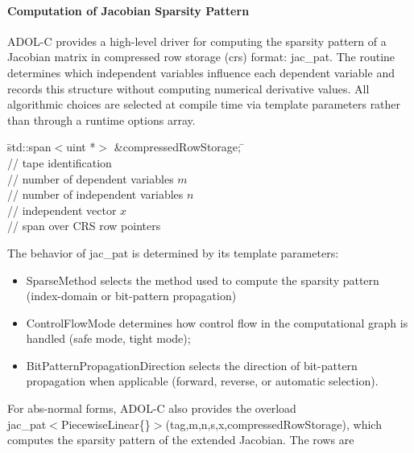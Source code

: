 \documentclass[11pt,twoside]{article}
\begin{document}
\paragraph{Computation of Jacobian Sparsity Pattern}
%
ADOL-C provides a high-level driver for computing the sparsity pattern
of a Jacobian matrix in compressed row storage (crs) format:
{\sf jac\_pat}.  The routine determines which independent variables
influence each dependent variable and records this structure without
computing numerical derivative values.
%
All algorithmic choices are selected at compile time via template
parameters rather than through a runtime {\sf options} array.
%
\begin{tabbing}
\hspace{0.5in}\={\sf std::span$<$uint *$>$ \&compressedRowStorage;} \hspace{0.6in}\= \kill
{}\\
        \> // tape identification \\
               \> // number of dependent variables $m$ \\
               \> // number of independent variables $n$ \\
 \> // independent vector $x$ \\
 \> // span over CRS row pointers \\
\end{tabbing}
%
The behavior of {\sf jac\_pat} is determined by its template parameters:
\begin{itemize}
  \item {\sf SparseMethod} selects the method used to compute the
        sparsity pattern (index-domain or bit-pattern propagation)
  \item {\sf ControlFlowMode} determines how control flow in the
        computational graph is handled (safe mode, tight mode);
  \item {\sf BitPatternPropagationDirection} selects the direction of
        bit-pattern propagation when applicable (forward, reverse, or
        automatic selection).
\end{itemize}
%
For abs-normal forms, ADOL-C also provides the overload \\
{\sf jac\_pat$<$PiecewiseLinear\{\}$>$(tag,m,n,s,x,compressedRowStorage)},
which computes the sparsity pattern of the extended Jacobian. The rows are
\end{document}
